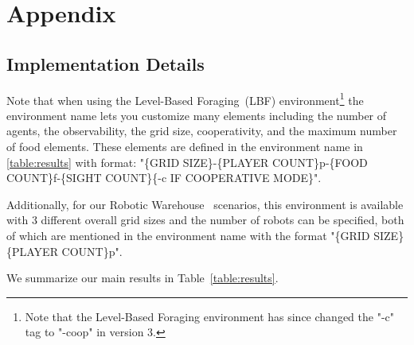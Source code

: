 \section{Appendix}

\subsection{Implementation Details}

Note that when using the Level-Based Foraging~(LBF) environment\footnote{Note that the Level-Based Foraging environment has since changed the "-c" tag to "-coop" in version 3.} \cite{christianos2020shared, papoudakis2021benchmarking} the environment name lets you customize many elements including the number of agents, the observability, the grid size, cooperativity, and the maximum number of food elements. These elements are defined in the environment name in \ref{table:results} with format: "\{GRID SIZE\}-\{PLAYER COUNT\}p-\{FOOD COUNT\}f-\{SIGHT COUNT\}\{-c IF COOPERATIVE MODE\}".


Additionally, for our Robotic Warehouse~\cite{papoudakis2021benchmarking, christianos2020shared} scenarios, this environment is available with 3 different overall grid sizes and the number of robots can be specified, both of which are mentioned in the environment name with the format "\{GRID SIZE\} \{PLAYER COUNT\}p".


We summarize our main results in Table~\ref{table:results}.

